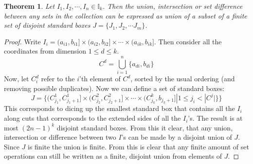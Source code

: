 \documentclass[12pt, a4paper]{article}
\newtheorem{theorem}{Theorem}[section]
\numberwithin{equation}{section}
\begin{document}
\begin{theorem}
\label{diceup}
Let $I_1, I_2,\cdots, I_n\in\mathbb{I}_k$. Then the union, intersection or set difference between any sets in the collection can be expressed as union of a subset of a finite set of disjoint standard boxes $J=\{J_1,J_2,\cdots J_m\}$.
\end{theorem}
\begin{proof}
Write $I_i=(a_{i1},b_{i1}]\times(a_{i2},b_{i2}]\times\cdots\times(a_{ik},b_{ik}]$. Then consider all the coordinates from dimension $1\le d\le k$.
\begin{equation}
C^d=\bigcup_{i=1}^n\{a_{di},b_{di}\}
\end{equation}
Now, let $C^d_i$ refer to the $i$'th element of $C^d$, sorted by the usual ordering (and removing possible duplicates). Now we can define a set of standard boxes:
\begin{equation}
J=\{(C^1_{j_1},C^1_{j_1+1}]\times(C^2_{j_2},C^2_{j_2+1}]\times\cdots\times(C^k_{j_k},b_{j_k+1}]|1\le j_i<|C^j|\}\}
\end{equation}
This corresponds to dicing up the smallest standard box that contains all the $I_i$ along cuts that corresponds to the extended sides of all the $I_i$'s. The result is at most $(2n-1)^k$ disjoint standard boxes. From this it clear, that any union, intersection or difference between two $I$'s can be made by a disjoint union of $J$. Since $J$ is finite the union is finite. From this is clear that any finite amount of set operations can still be written as a finite, disjoint union from elements of $J$.
\end{proof}
\end{document}
